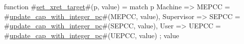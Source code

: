 function #\hyperref[sailRISCVzsetzyxretzytarget]{set\_xret\_target}#(p, value) = {
  match p {
    Machine    => MEPCC = #\hyperref[sailRISCVzupdatezycapzywithzyintegerzypc]{update\_cap\_with\_integer\_pc}#(MEPCC, value),
    Supervisor => SEPCC = #\hyperref[sailRISCVzupdatezycapzywithzyintegerzypc]{update\_cap\_with\_integer\_pc}#(SEPCC, value),
    User       => UEPCC = #\hyperref[sailRISCVzupdatezycapzywithzyintegerzypc]{update\_cap\_with\_integer\_pc}#(UEPCC, value)
  };
  value
}
